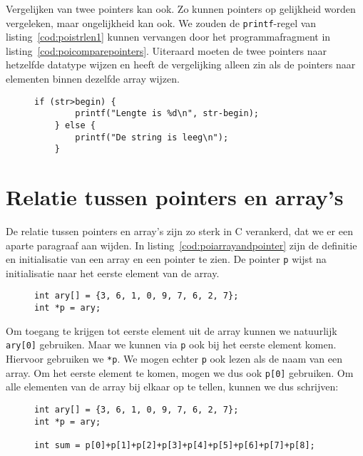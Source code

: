 Vergelijken van twee pointers kan ook. Zo kunnen pointers op gelijkheid worden vergeleken, maar ongelijkheid kan ook. We zouden de \texttt{printf}-regel van listing~\ref{cod:poistrlen1} kunnen vervangen door het programmafragment in listing~\ref{cod:poicomparepointers}.
Uiteraard moeten de twee pointers naar hetzelfde datatype wijzen en heeft de vergelijking alleen zin als de pointers naar elementen binnen dezelfde array wijzen.

\begin{figure}[!ht]
\begin{lstlisting}[caption=Vergelijken van twee pointers.,label=cod:poicomparepointers]
    if (str>begin) {
        printf("Lengte is %d\n", str-begin);
    } else {
        printf("De string is leeg\n");
    }
\end{lstlisting}
\end{figure}


\section{Relatie tussen pointers en array's}
\label{sec:relatietussenpointersenarrays}
De relatie tussen pointers en array's zijn zo sterk in C verankerd, dat we er een aparte paragraaf aan wijden. In listing~\ref{cod:poiarrayandpointer} zijn de definitie en initialisatie van een array en een pointer te zien. De pointer \texttt{p} wijst na initialisatie naar het eerste element van de array.

\begin{figure}[!ht]
\begin{lstlisting}[caption=Definitie en initialisatie van een array en een pointer.,label=cod:poiarrayandpointer]
int ary[] = {3, 6, 1, 0, 9, 7, 6, 2, 7};
int *p = ary;
\end{lstlisting}
\end{figure}

Om toegang te krijgen tot eerste element uit de array kunnen we natuurlijk \texttt{ary[0]} gebruiken. Maar we kunnen via \texttt{p} ook bij het eerste element komen. Hiervoor gebruiken we \texttt{*p}. We mogen echter \texttt{p} ook lezen als de naam van een array. Om het eerste element te komen, mogen we dus ook \texttt{p[0]} gebruiken. Om alle elementen van de array bij elkaar op te tellen, kunnen we dus schrijven:

\begin{figure}[!ht]
\begin{lstlisting}[caption=Bepalen van de som van elementen in een array.,label=cod:poiarrayandpointersym]
int ary[] = {3, 6, 1, 0, 9, 7, 6, 2, 7};
int *p = ary;

int sum = p[0]+p[1]+p[2]+p[3]+p[4]+p[5]+p[6]+p[7]+p[8];
\end{lstlisting}
\end{figure}

